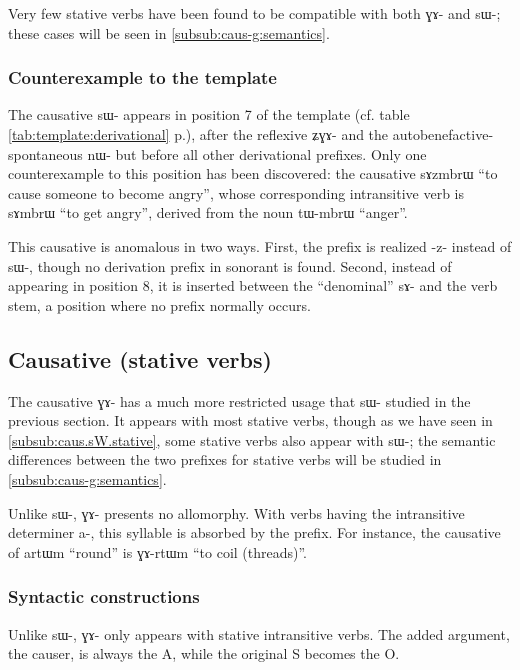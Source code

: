 \documentclass[oldfontcommands,oneside,a4paper,11pt]{memoir}
\newcommand{\ipa}[1]{{\phon #1}} %
\newcommand{\jg}[1]{\ipa{#1}\index{Japhug #1}}
\begin{document}
  Very few stative verbs have been found to be compatible with both \ipa{ɣɤ-} and \ipa{sɯ-}; these cases will be seen in \ref{subsub:caus-g:semantics}.
 
 
 
 
 \subsubsection{Counterexample to the template} \label{subsub:counterexample.caus}
 The causative \ipa{sɯ-} appears in position 7 of the template (cf. table \ref{tab:template:derivational} p.\pageref{tab:template:derivational}), after the reflexive \ipa{ʑɣɤ-} and the autobenefactive-spontaneous \ipa{nɯ-} but before all other derivational prefixes. Only one counterexample to this position has been discovered: the causative \ipa{sɤzmbrɯ} ``to cause someone to become angry'', whose corresponding intransitive verb is \ipa{sɤmbrɯ} ``to get angry'', derived from the noun \ipa{tɯ-mbrɯ} ``anger''.
  
 
 This causative is anomalous in two ways. First, the prefix is realized \ipa{-z-} instead of \ipa{sɯ-}, though no derivation prefix in sonorant is found. Second, instead of appearing in position 8, it is inserted between the ``denominal'' \ipa{sɤ-} and the verb stem, a position where no prefix normally occurs.

\subsection{Causative (stative verbs)} \label{sub:caus2}

The causative \ipa{ɣɤ-} has a much more restricted usage that \ipa{sɯ-} studied in the previous section. It appears with most stative verbs, though as we have seen in \ref{subsub:caus.sW.stative},  some stative verbs also appear with \ipa{sɯ-}; the semantic differences between the two prefixes for stative verbs will be studied in \ref{subsub:caus-g:semantics}.


Unlike \ipa{sɯ-}, \ipa{ɣɤ-} presents no allomorphy. With verbs having the intransitive determiner \ipa{a-}, this syllable is absorbed by the prefix. For instance, the causative of \jg{artɯm} ``round'' is \jg{ɣɤ-rtɯm} ``to coil (threads)''.
\subsubsection{Syntactic constructions} \label{subsub:caus-g:syntax}
Unlike \ipa{sɯ-}, \ipa{ɣɤ-} only appears with stative intransitive verbs. The added argument, the causer, is always the A, while the original S becomes the O.
\end{document}
